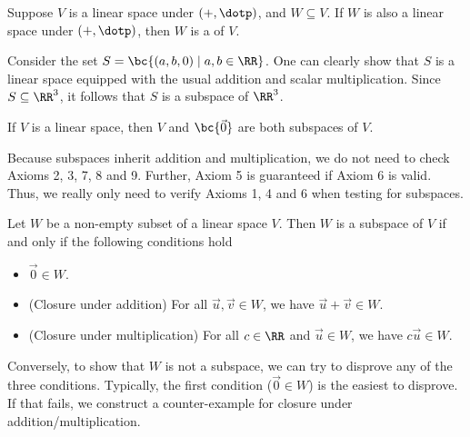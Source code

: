 \begin{definition}
    Suppose $V$ is a linear space under $(+, \dotp)$, and $W \subseteq V$. If $W$ is also a linear space under $(+, \dotp)$, then $W$ is a  of $V$.
\end{definition}

\begin{example}
    Consider the set $S = \bc{(a, b, 0) \mid a, b \in \RR}$. One can clearly show that $S$ is a linear space equipped with the usual addition and scalar multiplication. Since $S \subseteq \RR^3$, it follows that $S$ is a subspace of $\RR^3$.
\end{example}

\begin{example}
    If $V$ is a linear space, then $V$ and $\bc{\vec 0}$ are both subspaces of $V$.
\end{example}

Because subspaces inherit addition and multiplication, we do not need to check Axioms 2, 3, 7, 8 and 9. Further, Axiom 5 is guaranteed if Axiom 6 is valid. Thus, we really only need to verify Axioms 1, 4 and 6 when testing for subspaces.

\begin{recipe}
    Let $W$ be a non-empty subset of a linear space $V$. Then $W$ is a subspace of $V$ if and only if the following conditions hold
    \begin{itemize}
        \item $\vec 0 \in W$.
        \item (Closure under addition) For all $\vec u, \vec v \in W$, we have $\vec u + \vec v \in W$.
        \item (Closure under multiplication) For all $c \in \RR$ and $\vec u \in W$, we have $c \vec u \in W$.
    \end{itemize}
\end{recipe}

Conversely, to show that $W$ is not a subspace, we can try to disprove any of the three conditions. Typically, the first condition ($\vec 0 \in W$) is the easiest to disprove. If that fails, we construct a counter-example for closure under addition/multiplication.


